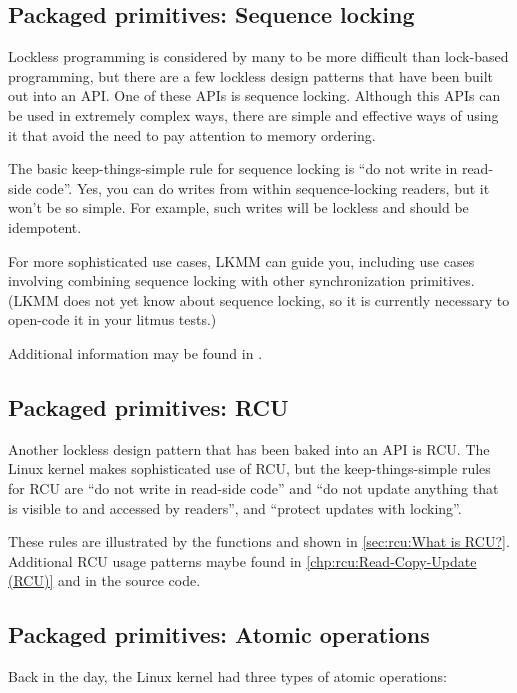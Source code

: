 \subsection{Packaged primitives: Sequence locking}

Lockless programming is considered by many to be more difficult than
lock-based programming, but there are a few lockless design patterns that
have been built out into an API\@.
One of these APIs is sequence locking.
Although this APIs can be used in extremely complex ways, there are simple
and effective ways of using it that avoid the need to pay attention to
memory ordering.

The basic keep-things-simple rule for sequence locking is ``do not write
in read-side code''.
Yes, you can do writes from within sequence-locking readers, but it
won't be so simple.
For example, such writes will be lockless and should be idempotent.

For more sophisticated use cases, LKMM can guide you, including use
cases involving combining sequence locking with other synchronization
primitives.
(LKMM does not yet know about sequence locking, so it is currently
necessary to open-code it in your litmus tests.)

Additional information may be found in .

\subsection{Packaged primitives: RCU}

Another lockless design pattern that has been baked into an API
is RCU\@.
The Linux kernel makes sophisticated use of RCU, but the
keep-things-simple rules for RCU are ``do not write in read-side code''
and ``do not update anything that is visible to and accessed by readers'',
and ``protect updates with locking''.

These rules are illustrated by the functions  and
 shown in
\cref{sec:rcu:What is RCU?}.
Additional RCU usage patterns maybe found in
\cref{chp:rcu:Read-Copy-Update (RCU)}
and in the source code.


\subsection{Packaged primitives: Atomic operations}

Back in the day, the Linux kernel had three types of atomic operations:

